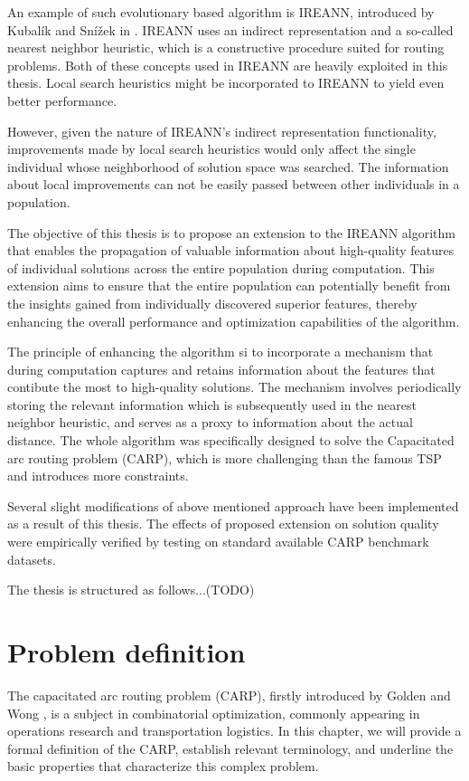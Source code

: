 \documentclass[twoside]{ctuthesis}
\theoremstyle{plain}
\theoremstyle{definition}
\theoremstyle{note}
\begin{document}
An example of such evolutionary based algorithm is IREANN, introduced by Kubalík and Snížek in \cite{kubalik2014novel}. IREANN uses an indirect representation and a so-called nearest neighbor heuristic, which is a constructive procedure suited for routing problems. Both of these concepts used in IREANN are heavily exploited in this thesis. Local search heuristics might be incorporated to IREANN to yield even better performance.

However, given the nature of IREANN's indirect representation functionality, improvements made by local search heuristics would only affect the single individual whose neighborhood of solution space was searched. The information about local improvements can not be easily passed between other individuals in a population. 

The objective of this thesis is to propose an extension to the IREANN algorithm that enables the propagation of valuable information about high-quality features of individual solutions across the entire population during computation. This extension aims to ensure that the entire population can potentially benefit from the insights gained from individually discovered superior features, thereby enhancing the overall performance and optimization capabilities of the algorithm.

The principle of enhancing the algorithm si to incorporate a mechanism that during computation captures and retains information about the features that contibute the most to high-quality solutions. The mechanism involves periodically storing the relevant information which is subsequently used in the nearest neighbor heuristic, and serves as a proxy to information about the actual distance. The whole algorithm was specifically designed to solve the Capacitated arc routing problem (CARP), which is more challenging than the famous TSP and introduces more constraints.

Several slight modifications of above mentioned approach have been implemented as a result of this thesis. The effects of proposed extension on solution quality were empirically verified by testing on standard available CARP benchmark datasets.

The thesis is structured as follows...(TODO)

\chapter{Problem definition}
The capacitated arc routing problem (CARP), firstly introduced by Golden and Wong \cite{golden1981capacitated}, is a subject in combinatorial optimization, commonly appearing in operations research and transportation logistics. In this chapter, we will provide a formal definition of the CARP, establish relevant terminology, and underline the basic properties that characterize this complex problem.
\end{document}
